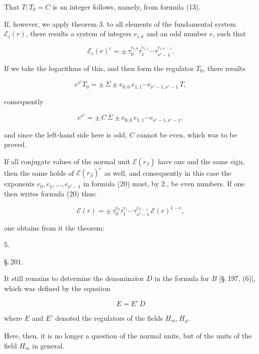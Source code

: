 
That $T:T_0 = C$ is an integer follows, namely, from formula (13).

If, however, we apply theorem 3. to all elements of the fundamental system $\mathcal{E}_i(r)$, there results a system of integers $e_{i,k}$ and an odd number $e$, such that

\[
\mathcal{E}_i(r)^e = \pm\, \tau_0^{e_{i,0}}\tau_1^{e_{i,1}} \cdots \tau_{\nu'-1}^{e_{i,\nu'-1}}.
\]

If we take the logarithms of this, and then form the regulator $T_0$, there results

\[
e^{\nu'} T_0 = \pm\, \Sigma \pm e_{0,0}\, e_{1,1} \cdots e_{\nu'-1,\nu'-1}\, T,
\]

consequently

\[
e^{\nu'} = \pm\, C\, \Sigma \pm e_{0,0}\, e_{1,1} \cdots e_{\nu'-1,\nu'-1},
\]

and since the left-hand side here is odd, $C$ cannot be even, which was to be proved.

If all conjugate values of the normal unit $\mathcal{E}(r_\beta)$ have one and the same sign, then the same holds of $\mathcal{E}(r_\beta)^e$ as well, and consequently in this case the exponents $e_0, e_1, \ldots, e_{\nu'-1}$ in formula (20) must, by 2., be even numbers. If one then writes formula (20) thus:

\[
\mathcal{E}(r) = \pm\, \tau_0^{e_0}\tau_1^{e_1} \cdots \tau_{\nu'-1}^{e_{\nu'-1}}\, \mathcal{E}(r)^{1-e},
\]

one obtains from it the theorem:

5. 

\begin{center}
\S.\,201.

\end{center}

It still remains to determine the denominator $D$ in the formula for $B$ [\S.\,197, (6)], which was defined by the equation

\[
E = E'\, D
\]

where $E$ and $E'$ denoted the regulators of the fields $H_m, H_\mu$.

Here, then, it is no longer a question of the normal units, but of the units of the field $H_m$ in general.
